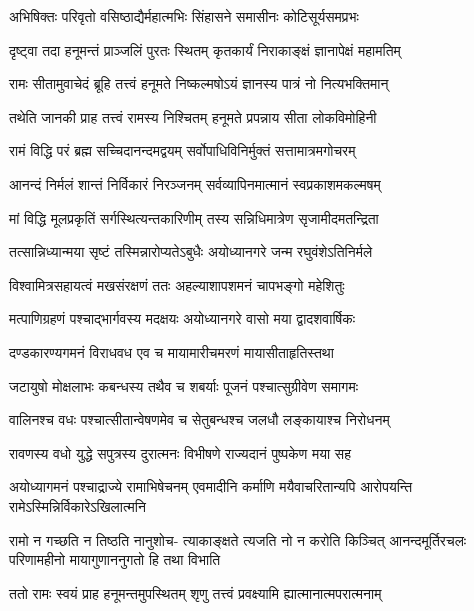 \twolineshloka
{अभिषिक्तः परिवृतो वसिष्ठाद्यैर्महात्मभिः}
{सिंहासने समासीनः कोटिसूर्यसमप्रभः} %

\twolineshloka
{दृष्ट्वा तदा हनूमन्तं प्राञ्जलिं पुरतः स्थितम्}
{कृतकार्यं निराकाङ्क्षं ज्ञानापेक्षं महामतिम्} %

\twolineshloka
{रामः सीतामुवाचेदं ब्रूहि तत्त्वं हनूमते}
{निष्कल्मषोऽयं ज्ञानस्य पात्रं नो नित्यभक्तिमान्} %

\twolineshloka
{तथेति जानकी प्राह तत्त्वं रामस्य निश्चितम्}
{हनूमते प्रपन्नाय सीता लोकविमोहिनी} %


\twolineshloka
{रामं विद्धि परं ब्रह्म सच्चिदानन्दमद्वयम्}
{सर्वोपाधिविनिर्मुक्तं सत्तामात्रमगोचरम्} %

\twolineshloka
{आनन्दं निर्मलं शान्तं निर्विकारं निरञ्जनम्}
{सर्वव्यापिनमात्मानं स्वप्रकाशमकल्मषम्} %

\twolineshloka
{मां विद्धि मूलप्रकृतिं सर्गस्थित्यन्तकारिणीम्}
{तस्य सन्निधिमात्रेण सृजामीदमतन्द्रिता} %

\twolineshloka
{तत्सान्निध्यान्मया सृष्टं तस्मिन्नारोप्यतेऽबुधैः}
{अयोध्यानगरे जन्म रघुवंशेऽतिनिर्मले} %

\twolineshloka
{विश्वामित्रसहायत्वं मखसंरक्षणं ततः}
{अहल्याशापशमनं चापभङ्गो महेशितुः} %

\twolineshloka
{मत्पाणिग्रहणं पश्चाद्भार्गवस्य मदक्षयः}
{अयोध्यानगरे वासो मया द्वादशवार्षिकः} %

\twolineshloka
{दण्डकारण्यगमनं विराधवध एव च}
{मायामारीचमरणं मायासीताहृतिस्तथा} %

\twolineshloka
{जटायुषो मोक्षलाभः कबन्धस्य तथैव च}
{शबर्याः पूजनं पश्चात्सुग्रीवेण समागमः} %

\twolineshloka
{वालिनश्च वधः पश्चात्सीतान्वेषणमेव च}
{सेतुबन्धश्च जलधौ लङ्कायाश्च निरोधनम्} %

\twolineshloka
{रावणस्य वधो युद्धे सपुत्रस्य दुरात्मनः}
{विभीषणे राज्यदानं पुष्पकेण मया सह} %

\threelineshloka
{अयोध्यागमनं पश्चाद्राज्ये रामाभिषेचनम्}
{एवमादीनि कर्माणि मयैवाचरितान्यपि}
{आरोपयन्ति रामेऽस्मिन्निर्विकारेऽखिलात्मनि} %

\fourlineindentedshloka
{रामो न गच्छति न तिष्ठति नानुशोच-}
{त्याकाङ्क्षते त्यजति नो न करोति किञ्चित्}
{आनन्दमूर्तिरचलः परिणामहीनो}
{मायागुणाननुगतो हि तथा विभाति} %


\twolineshloka
{ततो रामः स्वयं प्राह हनूमन्तमुपस्थितम्}
{शृणु तत्त्वं प्रवक्ष्यामि ह्यात्मानात्मपरात्मनाम्} %

